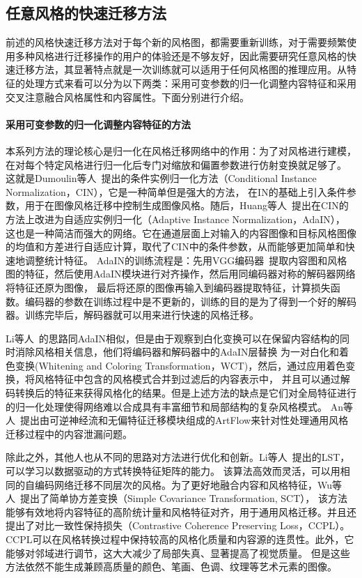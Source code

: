 \subsection{任意风格的快速迁移方法}
前述的风格快速迁移方法对于每个新的风格图，都需要重新训练，对于需要频繁使用多种风格进行迁移操作的用户的体验还是不够友好，因此需要研究任意风格的快速迁移方法，其显著特点就是一次训练就可以适用于任何风格图的推理应用。从特征的处理方式来看可以分为以下两类：采用可变参数的归一化调整内容特征和采用交叉注意融合风格属性和内容属性。下面分别进行介绍。
\paragraph{采用可变参数的归一化调整内容特征的方法}
本系列方法的理论核心是归一化在风格迁移网络中的作用：为了对风格进行建模，在对每个特定风格进行归一化后专门对缩放和偏置参数进行仿射变换就足够了。
这就是Dumoulin等人~\cite{dumoulin2016learned,ghiasi2017exploring}提出的条件实例归一化方法（Conditional Instance Normalization，CIN），它是一种简单但是强大的方法，
在IN的基础上引入条件参数，用于在图像风格迁移中控制生成图像风格。随后，Huang等人~\cite{huang2017arbitrary}提出在CIN的方法上改进为自适应实例归一化（Adaptive Instance Normalization，AdaIN），
这也是一种简洁而强大的网络。它在通道层面上对输入的内容图像和目标风格图像的均值和方差进行自适应计算，取代了CIN中的条件参数，从而能够更加简单和快速地调整统计特征。
AdaIN的训练流程是：先用VGG编码器~\cite{simonyan2015very}提取内容图和风格图的特征，然后使用AdaIN模块进行对齐操作，然后用同编码器对称的解码器网络将特征还原为图像，
最后将还原的图像再输入到编码器提取特征，计算损失函数。编码器的参数在训练过程中是不更新的，训练的目的是为了得到一个好的解码器。训练完毕后，解码器就可以用来进行快速的风格迁移。
\par Li等人~\cite{li2017universal}的思路同AdaIN相似，但是由于观察到白化变换可以在保留内容结构的同时消除风格相关信息，他们将编码器和解码器中的AdaIN层替换
为一对白化和着色变换(Whitening and Coloring Transformation，WCT)，然后，通过应用着色变换，将风格特征中包含的风格模式合并到过滤后的内容表示中，
并且可以通过解码转换后的特征来获得风格化的结果。但是上述方法的缺点是它们对全局特征进行的归一化处理使得网络难以合成具有丰富细节和局部结构的复杂风格模式。
An等人~\cite{an2021artflow}提出由可逆神经流和无偏特征迁移模块组成的ArtFlow来针对性处理通用风格迁移过程中的内容泄漏问题。
\par 除此之外，其他人也从不同的思路对方法进行优化和创新。Li等人~\cite{li2019learning}提出的LST，可以学习以数据驱动的方式转换特征矩阵的能力。
该算法高效而灵活，可以用相同的自编码网络迁移不同层次的风格。为了更好地融合内容和风格特征，Wu等人~\cite{wu2022ccpl}提出了简单协方差变换（Simple Covariance Transformation, SCT），
该方法能够有效地将内容特征的高阶统计量和风格特征对齐，用于通用风格迁移。并且还提出了对比一致性保持损失（Contrastive Coherence Preserving Loss，CCPL）。
CCPL可以在风格转换过程中保持较高的风格化质量和内容源的连贯性。此外，它能够对邻域进行调节，这大大减少了局部失真、显著提高了视觉质量。
但是这些方法依然不能生成兼顾高质量的颜色、笔画、色调、纹理等艺术元素的图像。


